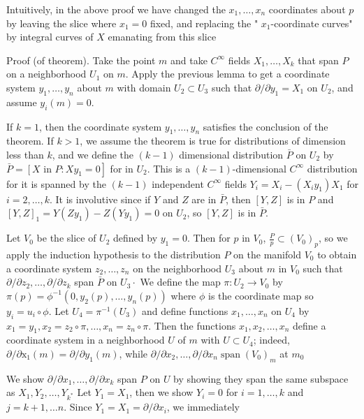 \documentclass[10pt]{article}
\begin{document}
Intuitively, in the above proof we have changed the $x_{1}, \ldots, x_{n}$ coordinates about $p$ by leaving the slice where $x_{1}=0$ fixed, and replacing the " $x_{1}$-coordinate curves" by integral curves of $X$ emanating from this slice

Proof (of theorem). Take the point $m$ and take $C^{\infty}$ fields $X_{1}, \ldots, X_{k}$ that span $P$ on a neighborhood $U_{1}$ on $m$. Apply the previous lemma to get a coordinate system $y_{1}, \ldots, y_{n}$ about $m$ with domain $U_{2} \subset U_{3}$ such that $\partial / \partial y_{1}=X_{1}$ on $U_{2}$, and assume $y_{i}(m)=0$.

If $k=1$, then the coordinate system $y_{1}, \ldots, y_{n}$ satisfies the conclusion of the theorem. If $k>1$, we assume the theorem is true for distributions of dimension less than $k$, and we define the $(k-1)$ dimensional distribution $\bar{P}$ on $U_{2}$ by $\bar{P}=\left[X\right.$ in $\left.P: X y_{1}=0\right]$ for in $U_{2} .$ This is a $(k-1)$-dimensional $C^{\infty}$ distribution for it is spanned by the $(k-1)$ independent $C^{\infty}$ fields $Y_{i}=X_{i}-\left(X_{i} y_{1}\right) X_{1}$ for $i=2, \ldots, k$. It is involutive since if $Y$ and $Z$ are in $\bar{P}$, then $[Y, Z]$ is in $P$ and $[Y, Z]_{1}=Y\left(Z y_{1}\right)-Z\left(Y y_{1}\right)=0$ on $U_{2}$, so $[Y, Z]$ is in $\bar{P}$.

Let $V_{0}$ be the slice of $U_{2}$ defined by $y_{1}=0$. Then for $p$ in $V_{0}$, $\frac{P}{p} \subset\left(V_{0}\right)_{p}$, so we apply the induction hypothesis to the distribution $P$ on the manifold $V_{0}$ to obtain a coordinate system $z_{2}, \ldots, z_{n}$ on the neighborhood $U_{3}$ about $m$ in $V_{0}$ such that $\partial / \partial z_{2}, \ldots, \partial / \partial z_{k}$ span $\bar{P}$ on $U_{3} \cdot$ We define the map $\pi: U_{2} \rightarrow V_{0}$ by $\pi(p)=\phi^{-1}\left(0, y_{2}(p), \ldots, y_{n}(p)\right)$ where $\phi$ is the coordinate map so $y_{i}=u_{i} \circ \phi .$ Let $U_{4}=\pi^{-1}\left(U_{3}\right)$ and define functions $x_{1}, \ldots, x_{n}$ on $U_{4}$ by $x_{1}=y_{1}, x_{2}=z_{2} \circ \pi, \ldots, x_{n}=z_{n} \circ \pi$. Then the functions $x_{1}, x_{2}, \ldots, x_{n}$ define a coordinate system in a neighborhood $U$ of $m$ with $U \subset U_{4}$; indeed, $\partial / \partial \mathrm{x}_{1}(m)=\partial / \partial y_{1}(m)$, while $\partial / \partial x_{2}, \ldots, \partial / \partial x_{n} \operatorname{span}\left(V_{0}\right)_{m}$ at $m_{0}$

We show $\partial / \partial x_{1}, \ldots, \partial / \partial x_{k}$ span $P$ on $U$ by showing they span the same subspace as $X_{1}, Y_{2}, \ldots, Y_{k^{*}}$ Let $Y_{1}=X_{1}$, then we show $Y_{i}=0$ for $i=1, \ldots, k$ and $j=k+1, \ldots n$. Since $Y_{1}=X_{1}=\partial / \partial x_{i}$, we immediately
\end{document}
